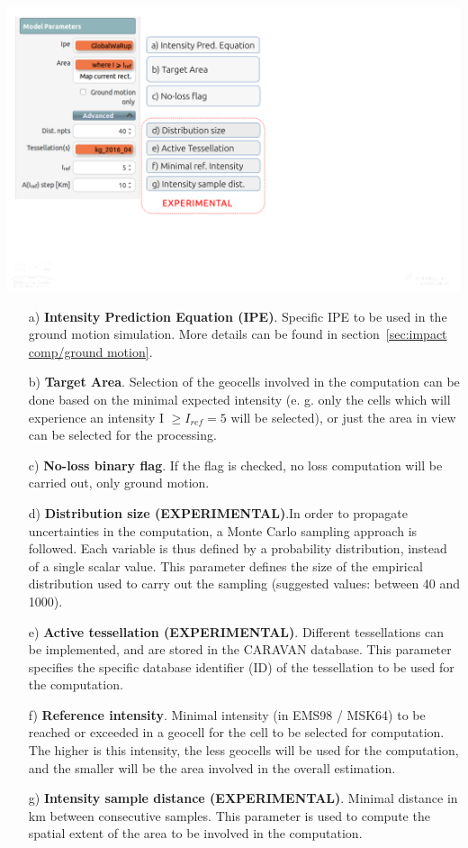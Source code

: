 \documentclass[12p]{article}
\begin{document}
\begin{center}
	\includegraphics[trim=0mm 40mm 60mm 0mm,clip,
width=\textwidth]{gui_model_params_comment}
\end{center}

\begin{itemize}
	\item[a)]{\textbf{Intensity Prediction Equation (IPE)}. Specific IPE to
be used in the ground motion simulation. More details can be found in
section~\ref{sec:impact comp/ground motion}.}
	\item[b)]{\textbf{Target Area}. Selection of the geocells involved in
the computation can be done based on the minimal expected intensity (e. g. only
the cells which will experience an intensity I $\ge I_{ref}=5$ will be
selected), or just the area in view can be selected for the processing.}
	\item[c)]{\textbf{No-loss binary flag}. If the flag is checked, no loss
computation will be carried out, only ground motion.}
	\item[d)]{\textbf{Distribution size (EXPERIMENTAL)}.In order to propagate uncertainties in the computation, a Monte Carlo sampling approach is followed. Each variable is thus defined by a probability distribution, instead of a single scalar value. This parameter defines the size of the empirical distribution used to carry out the sampling (suggested
values: between 40 and 1000).}
	\item[e)]{\textbf{Active tessellation (EXPERIMENTAL)}. Different tessellations can be implemented, and are stored in the CARAVAN database. This parameter specifies the specific database identifier (ID) of the
tessellation to be used for the computation.}
	\item[f)]{\textbf{Reference intensity}. Minimal intensity (in EMS98 /
MSK64) to be reached or exceeded in a geocell for the cell to be selected for
computation. The higher is this intensity, the less geocells will be used for
the computation, and the smaller will be the area involved in the overall
estimation.}
	\item[g)]{\textbf{Intensity sample distance (EXPERIMENTAL)}. Minimal
distance in km between consecutive samples. This parameter is used to compute
the spatial extent of the area to be involved in the computation.}
\end{itemize}
\end{document}
